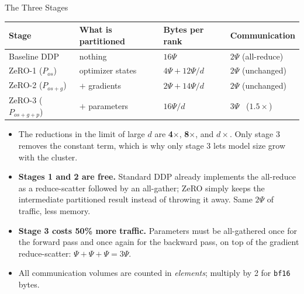 \begin{frame}{The Three Stages}
  \centering
  \footnotesize
  \begin{tabular}{@{}llll@{}}
    \toprule
    \textbf{Stage} & \textbf{What is partitioned} & \textbf{Bytes per rank} & \textbf{Communication} \\
    \midrule
    Baseline DDP           & nothing                              & $16\Psi$                  & $2\Psi$ (all-reduce) \\
    ZeRO-1 ($P_{os}$)      & optimizer states                     & $4\Psi + 12\Psi/d$        & $2\Psi$ (unchanged) \\
    ZeRO-2 ($P_{os+g}$)    & $+$ gradients                        & $2\Psi + 14\Psi/d$        & $2\Psi$ (unchanged) \\
    ZeRO-3 ($P_{os+g+p}$)  & $+$ parameters                       & $16\Psi/d$                & $3\Psi$ \ ($1.5\times$) \\
    \bottomrule
  \end{tabular}
  \vspace{0.7em}
  \begin{itemize}\footnotesize\itemsep0.25em
    \item[\textcolor{red}{$\blacktriangleright$}] The reductions in the limit of large $d$ are \textbf{4$\times$}, \textbf{8$\times$}, and \textbf{$d\times$}. Only stage 3 removes the constant term, which is why only stage 3 lets model size grow with the cluster.
    \item[\textcolor{red}{$\blacktriangleright$}] \textbf{Stages 1 and 2 are free.} Standard DDP already implements the all-reduce as a reduce-scatter followed by an all-gather; ZeRO simply keeps the intermediate partitioned result instead of throwing it away. Same $2\Psi$ of traffic, less memory.
    \item[\textcolor{red}{$\blacktriangleright$}] \textbf{Stage 3 costs 50\% more traffic.} Parameters must be all-gathered once for the forward pass and once again for the backward pass, on top of the gradient reduce-scatter: $\Psi + \Psi + \Psi = 3\Psi$.
    \item[\textcolor{red}{$\blacktriangleright$}] All communication volumes are counted in \emph{elements}; multiply by 2 for \texttt{bf16} bytes.
  \end{itemize}
\end{frame}

